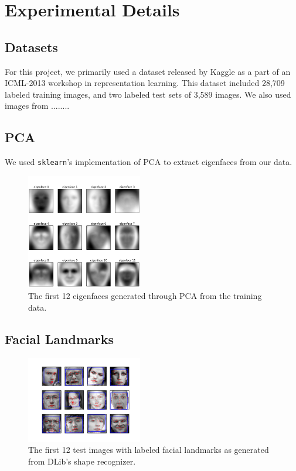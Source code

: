 \documentclass[11pt, twocolumn, twoside]{article}
\begin{document}
\section{Experimental Details}

\subsection{Datasets}

For this project, we primarily used a dataset released by Kaggle as a part of an
ICML-2013 workshop in representation learning. This dataset included 28,709 labeled
training images, and two labeled test sets of 3,589 images. We also used images from
........

\subsection{PCA}
We used \texttt{sklearn}'s implementation of PCA to extract eigenfaces from our data.

\begin{figure}
\centering
\includegraphics[width=0.45\textwidth]{eigenfaces}
\caption{\label{fig:eigenfaces} The first 12 eigenfaces generated through PCA from the
training data.}
\end{figure}

\subsection{Facial Landmarks}


\begin{figure}
\centering
\includegraphics[width=0.45\textwidth]{landmarks}
\caption{\label{fig:landmarks} The first 12 test images with labeled facial landmarks
as generated from DLib's shape recognizer.}
\end{figure}
\end{document}
